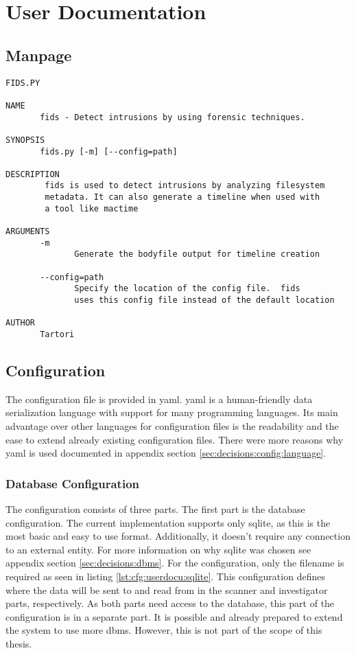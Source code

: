 \chapter{User Documentation}
\label{sec:userdocu}

\section{Manpage}

\begin{lstlisting}
FIDS.PY

NAME
       fids - Detect intrusions by using forensic techniques.

SYNOPSIS
       fids.py [-m] [--config=path]

DESCRIPTION
        fids is used to detect intrusions by analyzing filesystem
        metadata. It can also generate a timeline when used with 
        a tool like mactime

ARGUMENTS
       -m
              Generate the bodyfile output for timeline creation

       --config=path
              Specify the location of the config file.  fids
              uses this config file instead of the default location

AUTHOR
       Tartori

\end{lstlisting}

\section{Configuration}
\label{sec:userdocu:Configuration}

The configuration file is provided in \gls{yaml}. \gls{yaml} is a human-friendly data serialization language with support for many programming languages. Its main advantage over other languages for configuration files is the readability and the ease to extend already existing configuration files. There were more reasons why \gls{yaml} is used documented in appendix section \ref{sec:decisions:config:language}.

\subsection{Database Configuration}

The configuration consists of three parts. The first part is the database configuration. The current implementation supports only \gls{sqlite}, as this is the most basic and easy to use format. Additionally, it doesn't require any connection to an external entity. For more information on why \gls{sqlite} was chosen see appendix section \ref{sec:decisions:dbms}. For the configuration, only the filename is required as seen in listing \ref{lst:cfg:userdocu:sqlite}. This configuration defines where the data will be sent to and read from in the scanner and investigator parts, respectively. As both parts need access to the database, this part of the configuration is in a separate part. It is possible and already prepared to extend the system to use more \gls{dbms}. However, this is not part of the scope of this thesis.

